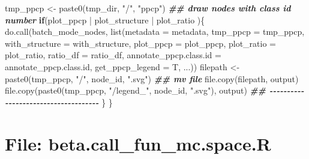\documentclass[
]{article}
\newenvironment{Shaded}{\begin{snugshade}}{\end{snugshade}}
\newcommand{\AttributeTok}[1]{\textcolor[rgb]{0.77,0.63,0.00}{#1}}
\newcommand{\ControlFlowTok}[1]{\textcolor[rgb]{0.13,0.29,0.53}{\textbf{#1}}}
\newcommand{\DocumentationTok}[1]{\textcolor[rgb]{0.56,0.35,0.01}{\textbf{\textit{#1}}}}
\newcommand{\FunctionTok}[1]{\textcolor[rgb]{0.00,0.00,0.00}{#1}}
\newcommand{\NormalTok}[1]{#1}
\newcommand{\OtherTok}[1]{\textcolor[rgb]{0.56,0.35,0.01}{#1}}
\newcommand{\SpecialCharTok}[1]{\textcolor[rgb]{0.00,0.00,0.00}{#1}}
\newcommand{\StringTok}[1]{\textcolor[rgb]{0.31,0.60,0.02}{#1}}
\begin{document}
\begin{Shaded}
\begin{Highlighting}[]
\NormalTok{    tmp\_ppcp }\OtherTok{\textless{}{-}} \FunctionTok{paste0}\NormalTok{(tmp\_dir, }\StringTok{"/"}\NormalTok{, }\StringTok{"ppcp"}\NormalTok{)}
    \DocumentationTok{\#\# draw nodes with class id number}
    \ControlFlowTok{if}\NormalTok{(plot\_ppcp }\SpecialCharTok{|}\NormalTok{ plot\_structure }\SpecialCharTok{|}\NormalTok{ plot\_ratio )\{}
      \FunctionTok{do.call}\NormalTok{(batch\_mode\_nodes, }\FunctionTok{list}\NormalTok{(}\AttributeTok{metadata =}\NormalTok{ metadata,}
                                     \AttributeTok{tmp\_ppcp =}\NormalTok{ tmp\_ppcp,}
                                     \AttributeTok{with\_structure =}\NormalTok{ with\_structure,}
                                     \AttributeTok{plot\_ppcp =}\NormalTok{ plot\_ppcp,}
                                     \AttributeTok{plot\_ratio =}\NormalTok{ plot\_ratio,}
                                     \AttributeTok{ratio\_df =}\NormalTok{ ratio\_df,}
                                     \AttributeTok{annotate\_ppcp.class.id =}\NormalTok{ annotate\_ppcp.class.id,}
                                     \AttributeTok{get\_ppcp\_legend =}\NormalTok{ T,}
\NormalTok{                                     ...))}
\NormalTok{      filepath }\OtherTok{\textless{}{-}} \FunctionTok{paste0}\NormalTok{(tmp\_ppcp, }\StringTok{"/"}\NormalTok{, node\_id, }\StringTok{".svg"}\NormalTok{)}
      \DocumentationTok{\#\# mv file}
      \FunctionTok{file.copy}\NormalTok{(filepath, output)}
      \FunctionTok{file.copy}\NormalTok{(}\FunctionTok{paste0}\NormalTok{(tmp\_ppcp, }\StringTok{"/legend\_"}\NormalTok{, node\_id, }\StringTok{".svg"}\NormalTok{), output)}
      \DocumentationTok{\#\# {-}{-}{-}{-}{-}{-}{-}{-}{-}{-}{-}{-}{-}{-}{-}{-}{-}{-}{-}{-}{-}{-}{-}{-}{-}{-}{-}{-}{-}{-}{-}{-}{-}{-}{-}{-}{-} }
\NormalTok{    \}}
\NormalTok{  \}}
\end{Highlighting}
\end{Shaded}

\hypertarget{file-beta.call_fun_mc.space.r}{%
\section{File: beta.call\_fun\_mc.space.R}\label{file-beta.call_fun_mc.space.r}}
\end{document}
